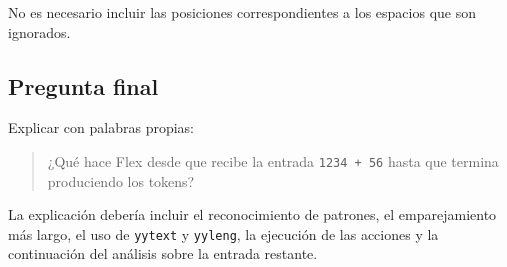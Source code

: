 \documentclass{article}
\begin{document}
No es necesario incluir las posiciones correspondientes a los espacios
que son ignorados.

\subsection{Pregunta final}

Explicar con palabras propias:

\begin{quote}
¿Qué hace Flex desde que recibe la entrada
\texttt{1234 + 56} hasta que termina produciendo los tokens?
\end{quote}

La explicación debería incluir el reconocimiento de patrones, el
emparejamiento más largo, el uso de \texttt{yytext} y \texttt{yyleng},
la ejecución de las acciones y la continuación del análisis sobre la
entrada restante.
\end{document}
